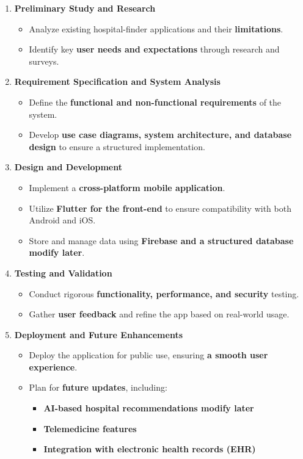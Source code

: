 \documentclass[12pt]{report}
\begin{document}
\begin{enumerate}
	\item \textbf{Preliminary Study and Research}
	      \begin{itemize}
		      \item Analyze existing hospital-finder applications and their \textbf{limitations}.
		      \item Identify key \textbf{user needs and expectations} through research and surveys.
	      \end{itemize}

	\item \textbf{Requirement Specification and System Analysis}
	      \begin{itemize}
		      \item Define the \textbf{functional and non-functional requirements} of the system.
		      \item Develop \textbf{use case diagrams, system architecture, and database design} to ensure a structured implementation.
	      \end{itemize}

	\item \textbf{Design and Development}
	      \begin{itemize}
		      \item Implement a \textbf{cross-platform mobile application}.
		      \item Utilize \textbf{Flutter for the front-end} to ensure compatibility with both Android and iOS.
		      \item Store and manage data using \textbf{Firebase and a structured database modify later}.
	      \end{itemize}

	\item \textbf{Testing and Validation}
	      \begin{itemize}
		      \item Conduct rigorous \textbf{functionality, performance, and security} testing.
		      \item Gather \textbf{user feedback} and refine the app based on real-world usage.
	      \end{itemize}

	\item \textbf{Deployment and Future Enhancements}
	      \begin{itemize}
		      \item Deploy the application for public use, ensuring \textbf{a smooth user experience}.
		      \item Plan for \textbf{future updates}, including:
		            \begin{itemize}
			            \item \textbf{AI-based hospital recommendations modify later}
			            \item \textbf{Telemedicine features}
			            \item \textbf{Integration with electronic health records (EHR)}
		            \end{itemize}
	      \end{itemize}
\end{enumerate}
\end{document}
